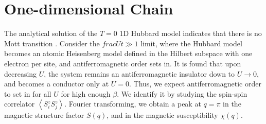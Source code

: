 \section{One-dimensional Chain}
\label{sec:1d-chain}

The analytical solution of the $T= 0$ \acs{1D} Hubbard model indicates that there is no Mott transition \cite{lieb_absence_1968}.
Consider the $frac{U}{t} \gg 1$ limit, where the Hubbard model becomes an atomic Heisenberg model defined in the Hilbert subspace with one electron per site, and antiferromagnetic order sets in.
It is found that upon decreasing $U$, the system remains an antiferromagnetic insulator down to $U \rightarrow 0$, and becomes a conductor only at $U = 0$.
Thus, we expect antiferromagnetic order to set in for all $U$ for high enough $\beta$.
We identify it by studying the spin-spin correlator $\left\langle S^z_i S^z_j \right\rangle$.
Fourier transforming, we obtain a peak at $q = \pi$ in the magnetic structure factor $S ( q ) $, and in the magnetic susceptibility $\chi (q)$.